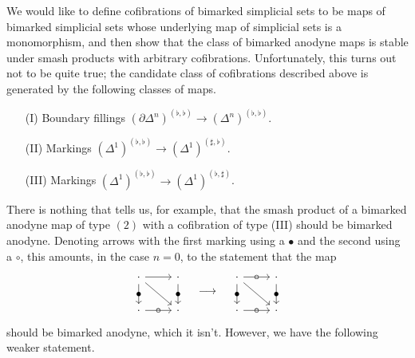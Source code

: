 \documentclass[main.tex]{subfiles}
\begin{document}
We would like to define cofibrations of bimarked simplicial sets to be maps of bimarked simplicial sets whose underlying map of simplicial sets is a monomorphism, and then show that the class of bimarked anodyne maps is stable under smash products with arbitrary cofibrations. Unfortunately, this turns out not to be quite true; the candidate class of cofibrations described above is generated by the following classes of maps.
\begin{itemize}
  \item[(I)] Boundary fillings $(\partial \Delta^{n})^{(\flat, \flat)} \to (\Delta^{n})^{(\flat, \flat)}$.

  \item[(II)] Markings $(\Delta^{1})^{(\flat, \flat)} \to (\Delta^{1})^{(\sharp, \flat)}$.

  \item[(III)] Markings $(\Delta^{1})^{(\flat, \flat)} \to (\Delta^{1})^{(\flat, \sharp)}$.
\end{itemize}
There is nothing that tells us, for example, that the smash product of a bimarked anodyne map of type $(2)$ with a cofibration of type (III) should be bimarked anodyne. Denoting arrows with the first marking using a $\bullet$ and the second using a $\circ$, this amounts, in the case $n = 0$, to the statement that the map
\begin{equation*}
  \begin{tikzcd}
    \cdot
    \arrow[r]
    \arrow[d, "\bullet" marking]
    \arrow[dr]
    & \cdot
    \arrow[d, "\bullet" marking]
    \\
    \cdot
    \arrow[r, "\circ" marking]
    & \cdot
  \end{tikzcd}
  \quad \longrightarrow \quad
  \begin{tikzcd}
    \cdot
    \arrow[r, "\circ" marking]
    \arrow[d, "\bullet" marking]
    \arrow[dr]
    & \cdot
    \arrow[d, "\bullet" marking]
    \\
    \cdot
    \arrow[r, "\circ" marking]
    & \cdot
  \end{tikzcd}
\end{equation*}
should be bimarked anodyne, which it isn't. However, we have the following weaker statement.
\end{document}
